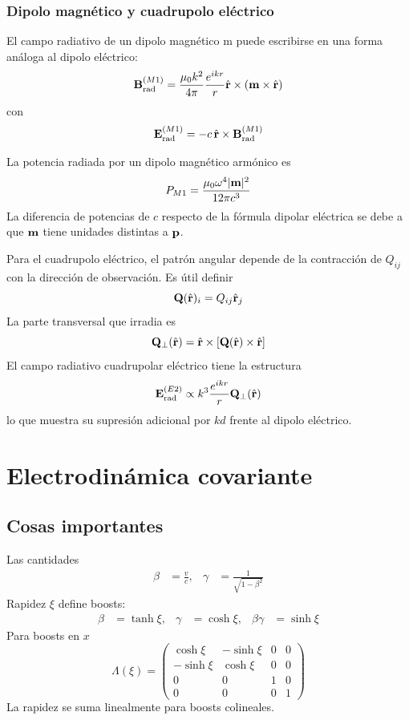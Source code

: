 \documentclass[]{article}
\numberwithin{equation}{section}
\begin{document}
\subsubsection{Dipolo magnético y cuadrupolo eléctrico}
El campo radiativo de un dipolo magnético m puede escribirse en una forma análoga al dipolo eléctrico:
\begin{equation}
	\n{B}_\mathrm{rad}^{(M1)} = \ku[k^2] \frac{e^{ikr}}{r} \rhat\times(\n{m}\times\rhat)
\end{equation}
con
\begin{equation}
	\mathbf{E}_\mathrm{rad}^{(M1)} = -c \, \hat{\mathbf{r}}\times\mathbf{B}_\mathrm{rad}^{(M1)}
\end{equation}

La potencia radiada por un dipolo magnético armónico es
\begin{equation}
	P_{M1} = \frac{\mu_{0}\omega^4|\mathbf{m}|^2}{12 \pi c^3}
\end{equation}
La diferencia de potencias de $c$ respecto de la fórmula dipolar eléctrica se debe a que $\mathbf{m}$ tiene unidades distintas a $\mathbf{p}$.

Para el cuadrupolo eléctrico, el patrón angular depende de la contracción de $Q_{ij}$ con la dirección de observación. Es útil definir
\begin{equation}
	\mathbf{Q}(\hat{\mathbf{r}})_i = Q_{ij} \hat{\mathbf{r}}_j
\end{equation}
La parte transversal que irradia es
\begin{equation}
	\mathbf{Q}_\perp(\hat{\mathbf{r}}) = \hat{\mathbf{r}}\times\left[\mathbf{Q}(\hat{\mathbf{r}})\times\hat{\mathbf{r}}\right]
\end{equation}
El campo radiativo cuadrupolar eléctrico tiene la estructura
\begin{equation}
	\mathbf{E}_\mathrm{rad}^{(E2)} \propto k^3 \frac{e^{ikr}}{r} \mathbf{Q}_\perp(\hat{\mathbf{r}})
\end{equation}
lo que muestra su supresión adicional por $kd$ frente al dipolo eléctrico.


\section{Electrodinámica covariante}
\subsection{Cosas importantes}
Las cantidades
\begin{align}
	\beta &= \frac{v}{c}, & \gamma &= \frac{1}{\sqrt{1 - \beta^2}}
\end{align}
Rapidez $\xi$ define boosts:
\begin{align}
	\beta &= \tanh\xi, & \gamma &= \cosh\xi, & \beta\gamma &= \sinh\xi
\end{align}
Para boosts en $x$
\begin{equation}
	\Lambda(\xi) = \begin{pmatrix}
		\cosh\xi  & -\sinh\xi & 0 & 0\\
		-\sinh\xi &  \cosh\xi & 0 & 0\\
		0 & 0 & 1 & 0\\
		0 & 0 & 0 & 1
	\end{pmatrix}
\end{equation}
La rapidez se suma linealmente para boosts colineales.
\end{document}
